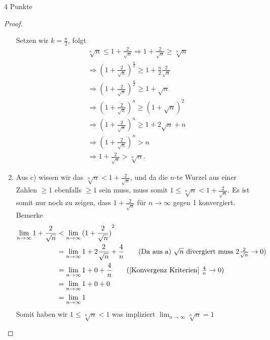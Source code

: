 \documentclass{../problemset}
\begin{document}
\begin{problem}{4 Punkte}
\begin{proof}
\begin{enumerate}
		      Setzen wir $k = \frac{n}{2}$, folgt
		      \begin{align*}
			      \sqrt[n]{n} \leq 1 + \frac{2}{\sqrt{n}} \Longrightarrow 1 + \frac{2}{\sqrt{n}} \ge \sqrt[n]{n} \\
			      \Longrightarrow {(1 + \frac{2}{\sqrt{n}})}^{\frac{n}{2}} \ge 1 + \frac{n}{2}\frac{2}{\sqrt{n}} \\
			      \Longrightarrow {(1 + \frac{2}{\sqrt{n}})}^{\frac{n}{2}} \ge 1 + \sqrt{n}                      \\
			      \Longrightarrow {(1 + \frac{2}{\sqrt{n}})}^n \ge {(1 + \sqrt{n})}^{2}                          \\
			      \Longrightarrow {(1 + \frac{2}{\sqrt{n}})}^n \ge 1 + 2\sqrt{n} + n                             \\
			      \Longrightarrow {(1 + \frac{2}{\sqrt{n}})}^n > n                                               \\
			      \Longrightarrow 1 + \frac{2}{\sqrt{n}} > \sqrt[n]{n}.
		      \end{align*}
		      \checkmark
		\item Aus c) wissen wir das $\sqrt[n]{n} < 1 + \frac{2}{\sqrt{n}}$, und da die $n$-te Wurzel aus einer Zahlen $\ge 1$ ebenfalls $\ge 1$ sein muss, muss somit $1 \le \sqrt[n]{n} < 1 + \frac{2}{\sqrt{n}}$.
		      Es ist somit nur noch zu zeigen, dass $1 + \frac{2}{\sqrt{n}}$ für $n \to \infty$ gegen 1 konvergiert.
		      Bemerke
		      \begin{align*}
			      \lim_{n \to \infty} 1 + \frac{2}{\sqrt{n}} & < \lim_{n \to \infty} {( 1 + \frac{2}{\sqrt{n}})}^2                                                                                 \\
			                                                 & = \lim_{n \to \infty} 1 + 2\frac{2}{\sqrt{n}} + \frac{4}{n} \tag{Da aus a) $\sqrt{n}$ divergiert muss $ 2\frac{2}{\sqrt{n}} \to 0$} \\
			                                                 & = \lim_{n \to \infty} 1 + 0 + \frac{4}{n} \tag{[Konvergenz Kriterien] $\frac{4}{n} \to 0$}                                          \\
			                                                 & = \lim_{n \to \infty} 1 + 0 + 0                                                                                                     \\
			                                                 & = \lim_{n \to \infty} 1
		      \end{align*}
		      Somit haben wir $1 \le \sqrt[n]{n} < 1$ was impliziert $\lim_{n \to \infty} \sqrt[n]{n} = 1$
		      \checkmark
	\end{enumerate}
\end{proof}
\end{problem}
\end{document}
